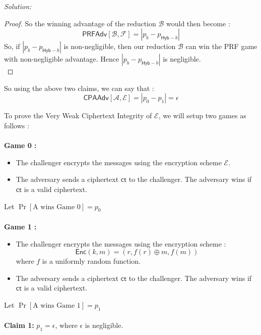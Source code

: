 \documentclass[a4paper, 11pt]{article}
\newenvironment{solution}
    {\textit{Solution:}}
    {\clearpage}
\newcommand{\ct}{\mathsf{ct}}
\newcommand{\hyb}{\mathsf{Hyb}}
\newcommand{\enc}{\mathsf{Enc}}
\newcommand{\prf}{\mathsf{PRFAdv}}
\newcommand{\calA}{\mathcal{A}}
\newcommand{\calB}{\mathcal{B}}
\newcommand{\calE}{\mathcal{E}}
\newcommand{\calF}{\mathcal{F}}
\begin{document}
\begin{solution}
\begin{proof}
        So the winning advantage of the reduction $\calB$ would then become :
        $$\prf[\calB, \calF] = | p_{b} - p_{\hyb-b} |$$
        So, if $| p_{b} - p_{\hyb-b} |$ is non-negligible, then our reduction $\calB$ can win the PRF game with non-negligible advantage. Hence $| p_{b} - p_{\hyb-b} |$ is negligible.\\
    \end{proof}
    So using the above two claims, we can say that :
    $$\mathsf{CPAAdv}[\calA, \calE] = |p_0 - p_1| = \epsilon$$

    To prove the Very Weak Ciphertext Integrity of $\calE$, we will setup two games as follows : \\ \\
    \textbf{Game 0 :}
    \begin{itemize}
        \item The challenger encrypts the messages using the encryption scheme $\calE$.
        \item The adversary sends a ciphertext $\ct$ to the challenger. The adversary wins if $\ct$ is a valid ciphertext.
    \end{itemize}
    Let $\Pr[\text{A wins Game 0}] = p_0$ \\ \\
    \textbf{Game 1 :}
    \begin{itemize}
        \item The challenger encrypts the messages using the encryption scheme :
              $$\enc(k, m) = (r, f(r) \oplus m, f(m))$$ where $f$ is a uniformly random function.
        \item The adversary sends a ciphertext $\ct$ to the challenger. The adversary wins if $\ct$ is a valid ciphertext.
    \end{itemize}
    Let $\Pr[\text{A wins Game 1}] = p_1$ \\ \\
    \textbf{Claim 1: } $p_1 = \epsilon$, where $\epsilon$ is negligible.


\end{solution}
\end{document}
